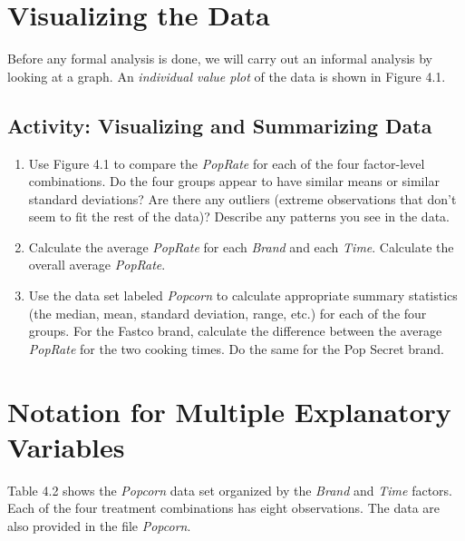 \documentclass[
]{report}
\providecommand{\tightlist}{%
  \setlength{\itemsep}{0pt}\setlength{\parskip}{0pt}}
\theoremstyle{definition}
\theoremstyle{definition}
\theoremstyle{definition}
\theoremstyle{definition}
\theoremstyle{remark}
\begin{document}
\hypertarget{visualizing-the-data}{%
\section{Visualizing the Data}\label{visualizing-the-data}}

Before any formal analysis is done, we will carry out an informal analysis by looking at a graph. An \emph{individual value plot} of the data is shown in Figure 4.1.

\hypertarget{activity-visualizing-and-summarizing-data}{%
\subsection{Activity: Visualizing and Summarizing Data}\label{activity-visualizing-and-summarizing-data}}

\begin{enumerate}
\def\labelenumi{\arabic{enumi}.}
\setcounter{enumi}{2}
\tightlist
\item
  Use Figure 4.1 to compare the \emph{PopRate} for each of the four factor-level combinations. Do the four groups appear to have similar means or similar standard deviations? Are there any outliers (extreme observations that don't seem to fit the rest of the data)? Describe any patterns you see in the data.\\
\item
  Calculate the average \emph{PopRate} for each \emph{Brand} and each \emph{Time}. Calculate the overall average \emph{PopRate}.\\
\item
  Use the data set labeled \emph{Popcorn} to calculate appropriate summary statistics (the median, mean, standard deviation, range, etc.) for each of the four groups. For the Fastco brand, calculate the difference between the average \emph{PopRate} for the two cooking times. Do the same for the Pop Secret brand.
\end{enumerate}

\hypertarget{notation-for-multiple-explanatory-variables}{%
\section{Notation for Multiple Explanatory Variables}\label{notation-for-multiple-explanatory-variables}}

Table 4.2 shows the \emph{Popcorn} data set organized by the \emph{Brand} and \emph{Time} factors. Each of the four treatment combinations has eight observations. The data are also provided in the file \emph{Popcorn}.
\end{document}
